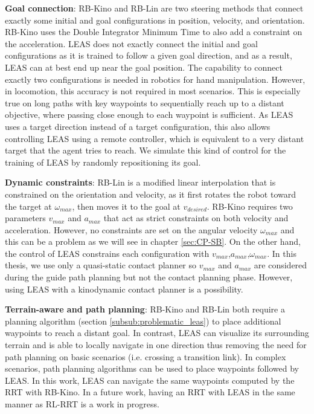 \noindent \textbf{Goal connection}:
RB-Kino \cite{kinodynamic_sm_2017} and RB-Lin \cite{AcyclicCP} are two steering methods that connect exactly some initial and goal configurations in position, velocity, and orientation. 
RB-Kino uses the Double Integrator Minimum Time \cite{DIMT} to also add a constraint on the acceleration.
LEAS does not exactly connect the initial and goal configurations as it is trained to follow a given goal direction, and as a result, LEAS can at best end up near the goal position.
The capability to connect exactly two configurations is needed in robotics for hand manipulation. However, in locomotion, this accuracy is not required in most scenarios.
This is especially true on long paths with key waypoints to sequentially reach up to a distant objective, where passing close enough to each waypoint is sufficient.
As LEAS uses a target direction instead of a target configuration, this also allows controlling LEAS using a remote controller, which is equivalent to a very distant target that the agent tries to reach. We simulate this kind of control for the training of LEAS by randomly repositioning its goal.

\noindent \textbf{Dynamic constraints}:
RB-Lin is a modified linear interpolation that is constrained on the orientation and velocity, as it first rotates the robot toward the target at $\omega_{max}$, then moves it to the goal at $v_{desired}$.
RB-Kino requires two parameters $v_{max}$ and $a_{max}$ that act as strict constraints on both velocity and acceleration. However, no constraints are set on the angular velocity $\omega_{max}$ and this can be a problem as we will see in chapter \ref{sec:CP-SB}. 
On the other hand, the control of LEAS constrains each configuration with $v_{max}$,$a_{max}$,$\omega_{max}$. 
In this thesis, we use only a quasi-static contact planner so $v_{max}$ and $a_{max}$ are considered during the guide path planning but not the contact planning phase. However, using LEAS with a kinodynamic contact planner is a possibility.

\noindent \textbf{Terrain-aware and path planning}:
RB-Kino and RB-Lin both require a planning algorithm (section \ref{subsub:problematic_leas}) to place additional waypoints to reach a distant goal. In contrast, LEAS can visualize its surrounding terrain and is able to locally navigate in one direction thus removing the need for path planning on basic scenarios (i.e. crossing a transition link). 
In complex scenarios, path planning algorithms can be used to place waypoints followed by LEAS. 
In this work, LEAS can navigate the same waypoints computed by the RRT with RB-Kino. In a future work, having an RRT with LEAS in the same manner as RL-RRT \cite{RL_RRT} is a work in progress.


